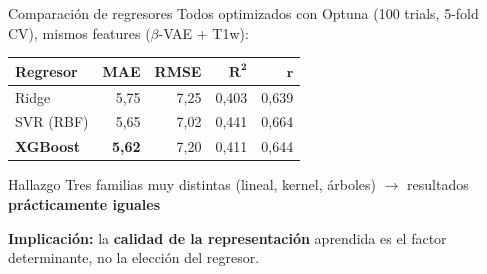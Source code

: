 \documentclass[aspectratio=169, 11pt]{beamer}
\newcommand{\highlight}[1]{\textcolor{uncaccent}{\textbf{#1}}}
\begin{document}
\begin{frame}{Comparación de regresores}
  {\small Todos optimizados con Optuna (100 trials, 5-fold CV), mismos features ($\beta$-VAE + T1w):}

  \vspace{0.2cm}
  \centering
  {\small
  \begin{tabular}{lrrrr}
    \toprule
    \textbf{Regresor} & \textbf{MAE} & \textbf{RMSE} & $\boldsymbol{R^2}$ & $\boldsymbol{r}$ \\
    \midrule
    Ridge & 5,75 & 7,25 & 0,403 & 0,639 \\
    SVR (RBF) & 5,65 & 7,02 & 0,441 & 0,664 \\
    \rowcolor{unclight}
    \textbf{XGBoost} & \textbf{5,62} & 7,20 & 0,411 & 0,644 \\
    \bottomrule
  \end{tabular}}

  \vspace{0.4cm}
  \begin{block}{Hallazgo}
    Tres familias muy distintas (lineal, kernel, árboles) $\rightarrow$ resultados \highlight{prácticamente iguales}
  \end{block}

  \vspace{0.2cm}
  \textbf{Implicación:} la \highlight{calidad de la representación} aprendida es el factor determinante, no la elección del regresor.
\end{frame}
\end{document}
